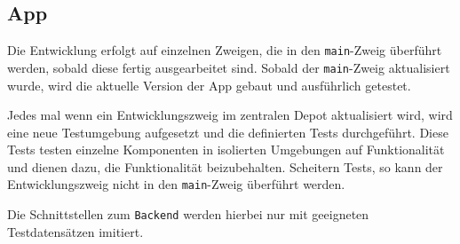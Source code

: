 \subsection{App}

Die Entwicklung erfolgt auf einzelnen Zweigen, die in den \verb#main#-Zweig überführt werden, sobald diese fertig ausgearbeitet sind.
Sobald der \verb#main#-Zweig aktualisiert wurde, wird die aktuelle Version der App gebaut und ausführlich getestet.

Jedes mal wenn ein Entwicklungszweig im zentralen Depot aktualisiert wird, wird eine neue Testumgebung aufgesetzt und die definierten Tests durchgeführt.
Diese Tests testen einzelne Komponenten in isolierten Umgebungen auf Funktionalität und dienen dazu, die Funktionalität beizubehalten.
Scheitern Tests, so kann der Entwicklungszweig nicht in den \verb#main#-Zweig überführt werden.

Die Schnittstellen zum \verb#Backend# werden hierbei nur mit geeigneten Testdatensätzen imitiert.